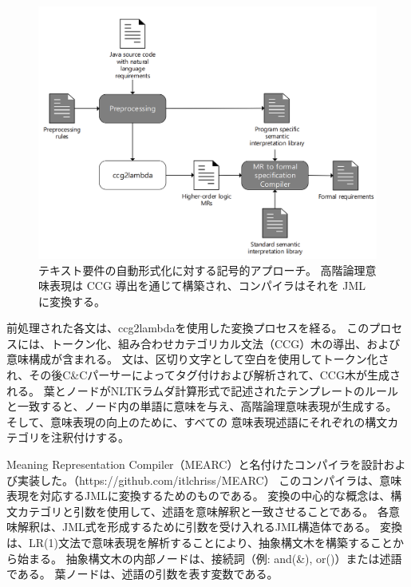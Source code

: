 \documentclass[uplatex, twocolumn,10pt]{jsarticle} %
\begin{document}
\begin{figure}[t]
    \begin{center}
        \includegraphics[width=\linewidth]{../image/TNLR/Fig1_Symb_app.png}
        \caption{テキスト要件の自動形式化に対する記号的アプローチ。
            高階論理意味表現は CCG 導出を通じて構築され、コンパイラはそれを JML に変換する。}
        \label{fig:Symb_app}
    \end{center}
\end{figure}

前処理された各文は、ccg2lambda\cite{3}を使用した変換プロセスを経る。
このプロセスには、トークン化、組み合わせカテゴリカル文法（CCG）木の導出、および意味構成が含まれる。
文は、区切り文字として空白を使用してトークン化され、その後C\&Cパーサーによってタグ付けおよび解析されて、CCG木が生成される。
葉とノードがNLTK\cite{7}ラムダ計算形式で記述されたテンプレートのルールと一致すると、ノード内の単語に意味を与え、高階論理意味表現が生成する。
そして、意味表現の向上のために、すべての 意味表現述語にそれぞれの構文カテゴリを注釈付けする。

Meaning Representation Compiler（MEARC）と名付けたコンパイラを設計および実装した。（https://github.com/itlchriss/MEARC）
このコンパイラは、意味表現を対応するJMLに変換するためのものである。
変換の中心的な概念は、構文カテゴリと引数を使用して、述語を意味解釈と一致させることである。
各意味解釈は、JML式を形成するために引数を受け入れるJML構造体である。
変換は、LR(1)文法で意味表現を解析することにより、抽象構文木を構築することから始まる。
抽象構文木の内部ノードは、接続詞（例: and(\&), or(\textbar)）または述語である。
葉ノードは、述語の引数を表す変数である。
\end{document}
